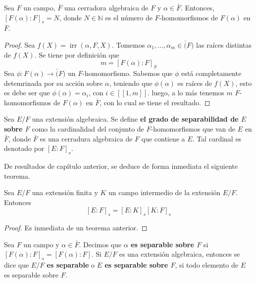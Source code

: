\documentclass[12pt]{report}
\theoremstyle{largebreak}
\newcommand\cf[3]{\ensuremath{#1:#2\rightarrow#3}}
\newcommand\natint[1]{\ensuremath{\left[\!\left[ #1\right]\!\right]}}
\DeclareMathOperator{\irr}{irr}
\begin{document}
    \begin{propo}
        Sea $F$ un campo, $\bar{F}$ una cerradora algebraica de $F$ y $\alpha\in\bar{F}$. Entonces, $\left[F(\alpha):F\right]_s=N$, donde $N\in\mathbb{N}$ es el número de $F$-homomorfismos de $F(\alpha)$ en $\bar{F}$.
    \end{propo}
    
    \begin{proof}
        Sea $f(X)=\irr(\alpha,F, X)$. Tomemos $\alpha_1,\dots,\alpha_m\in \bar(F)$ las raíces distintas de $f(X)$. Se tiene por definición que
        \begin{equation*}
            m=\left[F(\alpha):F\right]_{S}
        \end{equation*}
        Sea $\cf{\phi}{F(\alpha)}{\bar(F)}$ un $F$-homomorfismo. Sabemos que $\phi$ está completamente detemrinada por su acción sobre $\alpha$, teniendo que $\phi(\alpha)$ es raíces de $f(X)$, esto es debe ser que $\phi(\alpha)=\alpha_{i}$, con $i\in\natint{1,m}$. luego, a lo más tenemos $m$ $F$-homomorfismos de $F(\alpha)$ en $\bar{F}$, con lo cual se tiene el resultado.
    \end{proof}

    \begin{mydef}
        Sea $E/F$ una extensión algebraica. Se define \textbf{el grado de separabilidad de $E$ sobre $F$} como la cardinalidad del conjunto de $F$-homomorfismos que van de $E$ en $\bar{F}$, donde $\bar{F}$ es una cerradura algebraica de $F$ que contiene a $E$. Tal cardinal es denotado por $\left[E:F\right]_s$.
    \end{mydef}

    De resultados de capítulo anterior, se deduce de forma inmediata el siguiente teorema.

    \begin{theor}
        Sea $E/F$ una extensión finita y $K$ un campo intermedio de la extensión $E/F$. Entonces
        \begin{equation}
            \left[E:F\right]_s=\left[E:K\right]_s \left[K:F\right]_s
        \end{equation}
    \end{theor}

    \begin{proof}
        Es inmediata de un teorema anterior.
    \end{proof}

    \begin{mydef}
        Sea $F$ un campo y $\alpha\in\bar{F}$. Decimos que \textbf{$\alpha$ es separable sobre $F$} si $\left[F(\alpha):F\right]_s=\left[F(\alpha):F\right]$. Si $E/F$ es una extensión algebraica, entonces se dice que \textbf{$E/F$ es separable} o \textbf{$E$ es separable sobre $F$}, si todo elemento de $E$ es separable sobre $F$.
    \end{mydef}
\end{document}
